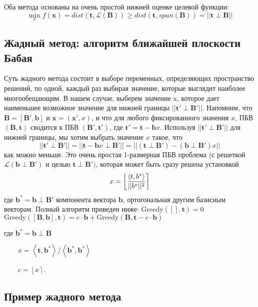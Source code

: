 Оба метода основаны на очень простой нижней оценке целевой функции:
$$ \min \limits_{x}f(\mathbf{x}) = dist\left(\mathbf{t}, \mathcal{L}\left(\mathbf{B}\right)\right)\geq dist \left(\mathbf{t}, span\left(\mathbf{B}\right)\right) = ||\mathbf{t} \perp \mathbf{B} || $$

\subsection{Жадный метод: алгоритм ближайшей плоскости Бабая}

Суть жадного метода состоит в выборе переменных, определяющих пространство решений, по одной, каждый раз выбирая значение, которые выглядит наиболее многообещающим. В нашем случае, выберем значение x, которое дает наименьшее возможное значение для нижней границы $ ||\mathbf{t}' \perp \mathbf{B}' || $. Напомним, что $ \mathbf{B}=\left[\mathbf{B}', \mathbf{b}\right] $ и $ \mathbf{x}=\left(\mathbf{x}' ,x\right) $, и что для любого фиксированного значения $ x $, ПБВ $ (\mathbf{B}, \mathbf{t}) $ сводится к ПБВ $ (\mathbf{B}',\mathbf{t}') $, где $ \mathbf{t}'=\mathbf{t}-\mathbf{b}x $. Используя $ ||\mathbf{t}' \perp \mathbf{B}' || $ для нижней границы, мы хотим выбрать значение $ x $ такое, что 
$$ || \mathbf{t}' \perp \mathbf{B}' || = || \mathbf{t} - \mathbf{b}x \perp \mathbf{B}' || = || (\mathbf{t} \perp \mathbf{B}') - (\mathbf{b} \perp \mathbf{B}')x || $$ 
как можно меньше. Это очень простая 1-размерная ПБВ проблема (с решеткой $ \mathcal{L}\left(\mathbf{b} \perp \mathbf{B}'\right) $ и целью $ \mathbf{t} \perp \mathbf{B}') $, которая может быть сразу решена установкой
$$ x = \left\lfloor \left\langle t,b^* \right\rangle \over ||b^*||^2 \right\rceil $$
где $ \mathbf{b}^* = \mathbf{b} \perp \mathbf{B}' $ компонента вектора $ \mathbf{b} $, ортогональная другим базисным векторам. Полный алгоритм приведен ниже: \newline
$ \text{Greedy}([], \mathbf{t}) = 0 $ \newline
$ \text{Greedy}([\mathbf{B},\mathbf{b}],\mathbf{t}) = c \cdot \mathbf{b} + \text{Greedy}(\mathbf{B},\mathbf{t} - c \cdot \mathbf{b}) $

$ \text{где } \mathbf{b}^* = \mathbf{b} \perp \mathbf{B} $

$ \qquad x = \left\langle \mathbf{t},\mathbf{b}^* \right\rangle / \left\langle \mathbf{b}^*,\mathbf{b}^* \right\rangle $

$ \qquad c = \left\lfloor x \right\rceil $.

\subsection{Пример жадного метода}

